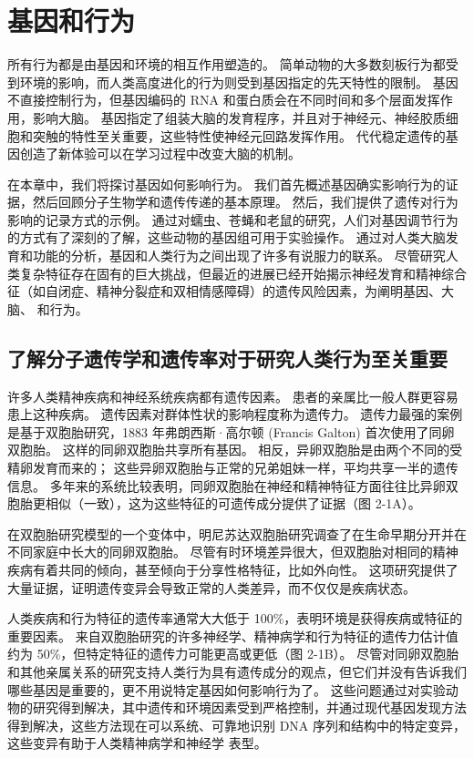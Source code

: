 \chapter{基因和行为} \label{chap:chap2}
所有行为都是由基因和环境的相互作用塑造的。 
简单动物的大多数刻板行为都受到环境的影响，而人类高度进化的行为则受到基因指定的先天特性的限制。 
基因不直接控制行为，但基因编码的 RNA 和蛋白质会在不同时间和多个层面发挥作用，影响大脑。 
基因指定了组装大脑的发育程序，并且对于神经元、神经胶质细胞和突触的特性至关重要，这些特性使神经元回路发挥作用。 
代代稳定遗传的基因创造了新体验可以在学习过程中改变大脑的机制。


在本章中，我们将探讨基因如何影响行为。 
我们首先概述基因确实影响行为的证据，然后回顾分子生物学和遗传传递的基本原理。 
然后，我们提供了遗传对行为影响的记录方式的示例。
通过对蠕虫、苍蝇和老鼠的研究，人们对基因调节行为的方式有了深刻的了解，这些动物的基因组可用于实验操作。 
通过对人类大脑发育和功能的分析，基因和人类行为之间出现了许多有说服力的联系。 
尽管研究人类复杂特征存在固有的巨大挑战，但最近的进展已经开始揭示神经发育和精神综合征（如自闭症、精神分裂症和双相情感障碍）的遗传风险因素，为阐明基因、大脑、 和行为。


\section{了解分子遗传学和遗传率对于研究人类行为至关重要}

许多人类精神疾病和神经系统疾病都有遗传因素。 
患者的亲属比一般人群更容易患上这种疾病。 
遗传因素对群体性状的影响程度称为遗传力。 
遗传力最强的案例是基于双胞胎研究，1883 年弗朗西斯·高尔顿 (Francis Galton) 首次使用了同卵双胞胎。 这样的同卵双胞胎共享所有基因。 
相反，异卵双胞胎是由两个不同的受精卵发育而来的； 这些异卵双胞胎与正常的兄弟姐妹一样，平均共享一半的遗传信息。 
多年来的系统比较表明，同卵双胞胎在神经和精神特征方面往往比异卵双胞胎更相似（一致），这为这些特征的可遗传成分提供了证据（图 2-1A）。


在双胞胎研究模型的一个变体中，明尼苏达双胞胎研究调查了在生命早期分开并在不同家庭中长大的同卵双胞胎。 尽管有时环境差异很大，但双胞胎对相同的精神疾病有着共同的倾向，甚至倾向于分享性格特征，比如外向性。 这项研究提供了大量证据，证明遗传变异会导致正常的人类差异，而不仅仅是疾病状态。

人类疾病和行为特征的遗传率通常大大低于 100\%，表明环境是获得疾病或特征的重要因素。 
来自双胞胎研究的许多神经学、精神病学和行为特征的遗传力估计值约为 50\%，但特定特征的遗传力可能更高或更低（图 2-1B）。 
尽管对同卵双胞胎和其他亲属关系的研究支持人类行为具有遗传成分的观点，但它们并没有告诉我们哪些基因是重要的，更不用说特定基因如何影响行为了。 
这些问题通过对实验动物的研究得到解决，其中遗传和环境因素受到严格控制，并通过现代基因发现方法得到解决，这些方法现在可以系统、可靠地识别 DNA 序列和结构中的特定变异，这些变异有助于人类精神病学和神经学 表型。


